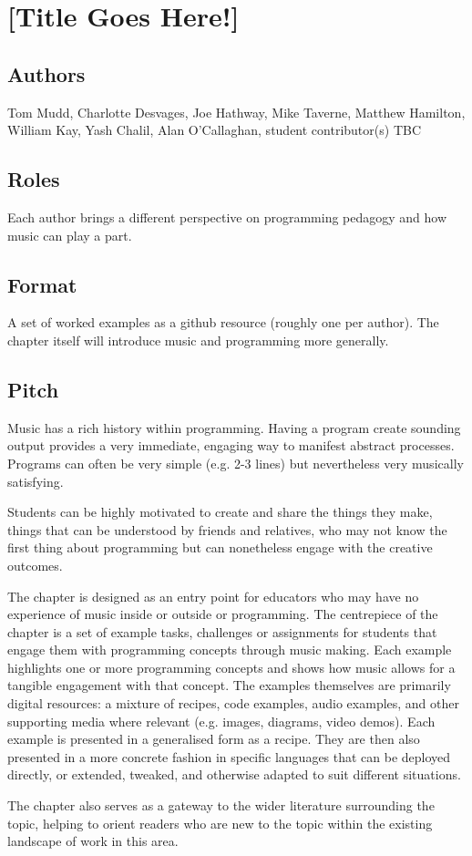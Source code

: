 \section*{[Title Goes Here!]}

\subsection*{Authors}
Tom Mudd, Charlotte Desvages, Joe Hathway, Mike Taverne, Matthew Hamilton, William Kay, Yash Chalil, Alan O'Callaghan, student contributor(s) TBC

\subsection*{Roles}
Each author brings a different perspective on programming pedagogy and how music can play a part.  

\subsection*{Format}
A set of worked examples as a github resource (roughly one per author). The chapter itself will introduce music and programming more generally.

\subsection*{Pitch}
Music has a rich history within programming. Having a program create sounding output provides a very immediate, engaging way to manifest abstract processes. Programs can often be very simple (e.g. 2-3 lines) but nevertheless very musically satisfying. 

Students can be highly motivated to create and share the things they make, things that can be understood by friends and relatives, who may not know the first thing about programming but can nonetheless engage with the creative outcomes.

The chapter is designed as an entry point for educators who may have no experience of music inside or outside or programming. The centrepiece of the chapter is a set of example tasks, challenges or assignments for students that engage them with programming concepts through music making. Each example highlights one or more programming concepts and shows how music allows for a tangible engagement with that concept. The examples themselves are primarily digital resources: a mixture of recipes, code examples, audio examples, and other supporting media where relevant (e.g. images, diagrams, video demos). Each example is presented in a generalised form as a recipe. They are then also presented in a more concrete fashion in specific languages that can be deployed directly, or extended, tweaked, and otherwise adapted to suit different situations.

The chapter also serves as a gateway to the wider literature surrounding the topic, helping to orient readers who are new to the topic within the existing landscape of work in this area.
